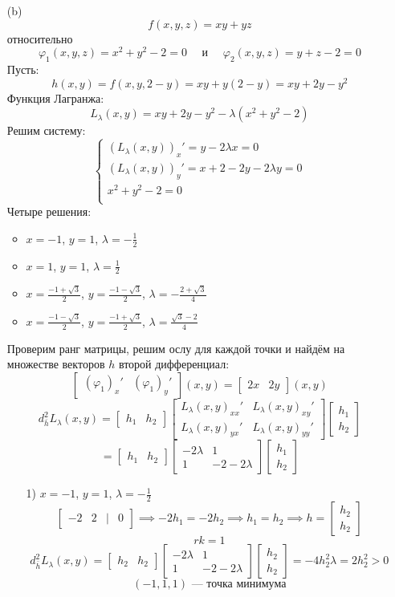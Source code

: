 \documentclass[a4paper]{article}
\newcommand{\matsq}[1]{\begin{bmatrix} #1 \end{bmatrix}}
\renewcommand{\f}[2]{\frac{#1}{#2}}
\newcommand{\case}[1]{\begin{cases} #1 \end{cases}}
\renewcommand{\phi}{\varphi}
\begin{document}
\begin{enumerate}
\begin{enumerate}
        \item[(b)]$$f(x, y, z) = xy+yz$$
        относительно
        $$\phi_1(x, y, z) = x^2+y^2-2=0 \quad \text{ и } \quad \phi_2(x, y, z) = y+z-2=0$$
        Пусть:
        $$h(x, y) = f(x, y, 2-y) = xy+y(2-y) = xy+2y-y^2$$
        Функция Лагранжа:
        $$L_{\lambda}(x, y) =xy+2y-y^2 -\lambda(x^2+y^2-2)$$
        Решим систему:
        $$\case{
            (L_{\lambda}(x, y))_x' = y-2\lambda x=0\\
            (L_{\lambda}(x, y))_y' = x+2-2y-2\lambda y=0\\
            x^2+y^2-2=0\\
        }$$
        Четыре решения:
        \begin{itemize}
            \item \( x = -1 \), \( y = 1 \), \( \lambda = -\frac{1}{2} \)
            \item \( x = 1 \), \( y = 1 \), \( \lambda = \frac{1}{2} \)
            \item \( x = \frac{-1 + \sqrt{3}}{2} \), \( y = \frac{-1 - \sqrt{3}}{2} \),  
            \( \lambda = -\f{2+\sqrt{3}}{4}\)
            \item \( x = \frac{-1 - \sqrt{3}}{2} \), \( y = \frac{-1 + \sqrt{3}}{2} \),  
            \( \lambda = \f{\sqrt{3}-2}{4}\)
        \end{itemize}
        Проверим ранг матрицы, решим ослу для каждой точки и найдём на множестве векторов $h$ второй дифференциал:
        $$\matsq{(\phi_1)_x' & (\phi_1)_y'}(x,y) = \matsq{2x & 2y}(x, y)$$
        $$d_{\bar{h}}^2L_{\lambda}(x, y) = \matsq{h_1 & h_2} 
        \matsq{
            L_{\lambda}(x,y)_{xx}' & L_{\lambda}(x,y)_{xy}'\\
            L_{\lambda}(x,y)_{yx}' & L_{\lambda}(x,y)_{yy}'
        }
        \matsq{h_1 \\ h_2} 
        $$
        $$=\matsq{h_1 & h_2} 
        \matsq{
            -2\lambda & 1\\
            1 & -2-2\lambda
        }
        \matsq{h_1 \\ h_2} $$
        \begin{enumerate}
            \item[1)] \( x = -1 \), \( y = 1 \), \( \lambda = -\frac{1}{2} \)\\
            $$\matsq{-2 & 2 & | & 0} \implies -2h_1 = -2h_2 \implies h_1 = h_2 
            \implies h=\matsq{h_2\\h_2}  $$
            $$rk = 1$$
            $$d_{\bar{h}}^2L_{\lambda}(x, y) = \matsq{h_2 & h_2} 
            \matsq{
                -2\lambda & 1\\
                1 & -2-2\lambda
            }
            \matsq{h_2 \\ h_2} = -4h_2^2\lambda = 2h_2^2 > 0$$
            $$(-1, 1, 1) \text{ --- точка минимума}$$



\end{enumerate}
\end{enumerate}
\end{enumerate}
\end{document}
